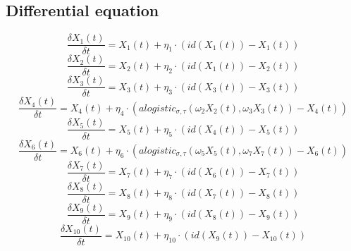 \documentclass[a4paper]{article}
\begin{document}
\subsection{Differential equation}

\begin{equation}
\frac{\delta X_{1}(t)}{\delta t} = X_{1}(t) + \eta_{1} \cdot ( id(X_{1}(t)) - X_{1}(t))
\end{equation}
\begin{equation}
\frac{\delta X_{2}(t)}{\delta t} = X_{2}(t) + \eta_{2} \cdot ( id(X_{1}(t)) - X_{2}(t))
\end{equation}
\begin{equation}
\frac{\delta X_{3}(t)}{\delta t} = X_{3}(t) + \eta_{3} \cdot ( id(X_{3}(t)) - X_{3}(t))
\end{equation}
\begin{equation}
\frac{\delta X_{4}(t)}{\delta t} = X_{4}(t) + \eta_{4} \cdot ( alogistic_{\sigma ,\tau}(\omega_{2} X_{2}(t),\omega_{3} X_{3}(t)) - X_{4}(t))
\end{equation}
\begin{equation}
\frac{\delta X_{5}(t)}{\delta t} = X_{5}(t) + \eta_{5} \cdot ( id(X_{4}(t)) - X_{5}(t))
\end{equation}
\begin{equation}
\frac{\delta X_{6}(t)}{\delta t} = X_{6}(t) + \eta_{6} \cdot (alogistic_{\sigma ,\tau}(\omega_{5} X_{5}(t),\omega_{7} X_{7}(t)) - X_{6}(t))
\end{equation}
\begin{equation}
\frac{\delta X_{7}(t)}{\delta t} = X_{7}(t) + \eta_{7} \cdot ( id(X_{6}(t)) - X_{7}(t))
\end{equation}
\begin{equation}
\frac{\delta X_{8}(t)}{\delta t} = X_{8}(t) + \eta_{8} \cdot ( id(X_{7}(t)) - X_{8}(t))
\end{equation}
\begin{equation}
\frac{\delta X_{9}(t)}{\delta t} = X_{9}(t) + \eta_{9} \cdot ( id(X_{8}(t)) - X_{9}(t))
\end{equation}
\begin{equation}
\frac{\delta X_{10}(t)}{\delta t} = X_{10}(t) + \eta_{10} \cdot ( id(X_{9}(t)) - X_{10}(t))
\end{equation}
\end{document}
